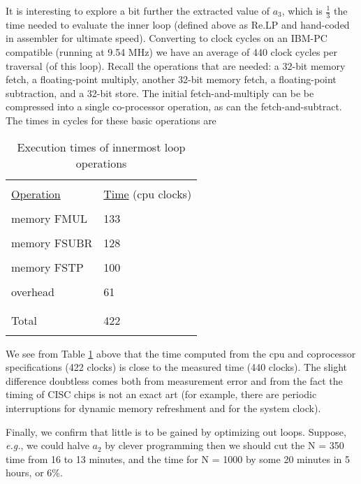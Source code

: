 It is interesting to explore a bit further the extracted value of $a_3$,
which is $\frac{1}{3}$ the time needed to evaluate the inner loop (defined
above as Re.LP and hand-coded in assembler for ultimate
speed). Converting to clock cycles on an IBM-PC compatible
(running at 9.54 MHz) we have an average of 440 clock cycles per
traversal (of this loop). Recall the operations that are needed: a
32-bit memory fetch, a floating-point multiply, another 32-bit
memory fetch, a floating-point subtraction, and a 32-bit store.
The initial fetch-and-multiply can be be compressed into a single
co-processor operation, as can the fetch-and-subtract. The times
in cycles for these basic operations are
\begin{table}
    \centering
    \caption{Execution times of innermost loop operations}
        \bigskip
    \label{tbl:09_02} 
    \setlength{\tabcolsep}{10pt}
        \begin{tabular}{|ll|}
            \hline &  \\
            \underline{Operation} & \underline{Time} \; (cpu clocks)\\
            &  \\
            memory FMUL &  133  \\
            &  \\
            memory FSUBR &  128  \\
            &  \\
            memory FSTP &  100  \\ 
            &  \\
            overhead &  61  \\ 
            &  \\
            \hline &  \\
            Total &  422  \\ 
            &  \\
            \hline
        \end{tabular}
\end{table}

We see from Table \ref{tbl:09_02} above that the time computed from the
cpu and coprocessor specifications (422 clocks) is close to the
measured time (440 clocks). The slight difference doubtless
comes both from measurement error and from the fact the
timing of CISC chips is not an exact art (for example, there are
periodic interruptions for dynamic memory refreshment and for
the system clock).

Finally, we confirm that little is to be gained by optimizing out
loops. Suppose, \textit{e.g.}, we could halve $a_2$ by clever programming
then we should cut the N = 350 time from 16 to 13 minutes, and 
the time for N = 1000 by some 20 minutes in 5 hours, or 6\%.

